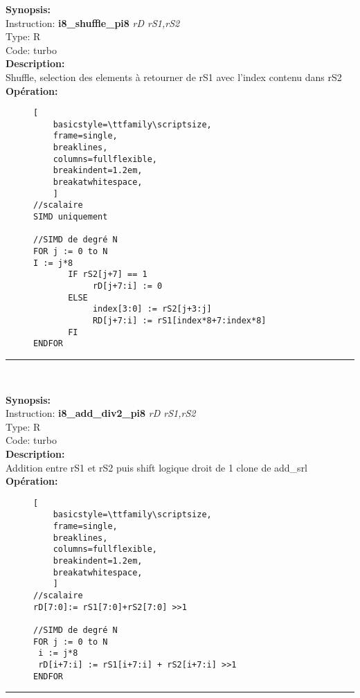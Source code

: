 {\scriptsize
\textbf{Synopsis:}\\
Instruction: \textbf{i8\_shuffle\_pi8 } \textit{rD rS1,rS2}\\
Type: R\\
Code: turbo\\
\textbf{Description:}\\
Shuffle, selection des elements à retourner de rS1 avec l’index contenu dans rS2\\
\textbf{Opération:}\\
    \begin{figure}[H]
    \begin{lstlisting}[
    basicstyle=\ttfamily\scriptsize,
    frame=single,
    breaklines,
    columns=fullflexible,
    breakindent=1.2em,
    breakatwhitespace,
    ]
//scalaire
SIMD uniquement 
    
//SIMD de degré N
FOR j := 0 to N
I := j*8
       IF rS2[j+7] == 1              
            rD[j+7:i] := 0    
       ELSE        
            index[3:0] := rS2[j+3:j]        
            RD[j+7:i] := rS1[index*8+7:index*8]  
       FI 
ENDFOR 
\end{lstlisting}
\end{figure}
}
\rule{8cm}{0.4pt}\\
{\scriptsize
\textbf{Synopsis:}\\
Instruction: \textbf{i8\_add\_div2\_pi8 } \textit{rD rS1,rS2}\\
Type: R\\
Code: turbo\\
\textbf{Description:}\\
Addition entre rS1 et rS2 puis shift logique droit de 1
clone de add\_srl\\
\textbf{Opération:}\\
    \begin{figure}[H]
    \begin{lstlisting}[
    basicstyle=\ttfamily\scriptsize,
    frame=single,
    breaklines,
    columns=fullflexible,
    breakindent=1.2em,
    breakatwhitespace,
    ]
//scalaire
rD[7:0]:= rS1[7:0]+rS2[7:0] >>1
    
//SIMD de degré N
FOR j := 0 to N    
 i := j*8    
 rD[i+7:i] := rS1[i+7:i] + rS2[i+7:i] >>1  
ENDFOR
\end{lstlisting}
\end{figure}
}
\rule{8cm}{0.4pt}\\
